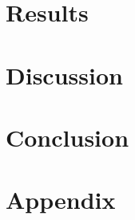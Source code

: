 \documentclass{article}
\begin{document}
\pagebreak

\section{Results}

\pagebreak

\section{Discussion}

\pagebreak

\section{Conclusion}

\pagebreak





\pagebreak

\section*{Appendix}
\end{document}
